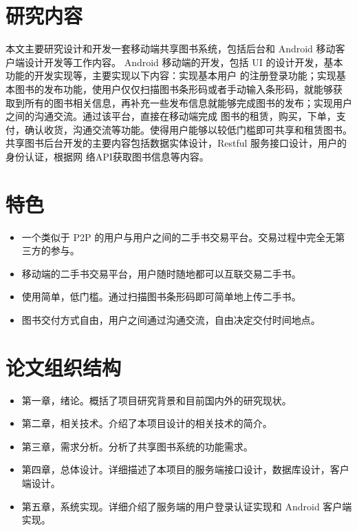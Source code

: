\section{研究内容}

本文主要研究设计和开发一套移动端共享图书系统，包括后台和 Android 移动客户端设计开发等工作内容。
 Android 移动端的开发，包括 UI 的设计开发，基本功能的开发实现等，主要实现以下内容：实现基本用户
的注册登录功能；实现基本图书的发布功能，使用户仅仅扫描图书条形码或者手动输入条形码，就能够获
取到所有的图书相关信息，再补充一些发布信息就能够完成图书的发布；实现用户之间的沟通交流。通过该平台，直接在移动端完成
图书的租赁，购买，下单，支付，确认收货，沟通交流等功能。使得用户能够以较低门槛即可共享和租赁图书。
共享图书后台开发的主要内容包括数据实体设计，Restful 服务接口设计，用户的身份认证，根据网
络API获取图书信息等内容。

\section{特色}

\begin{itemize}
    \item 一个类似于 P2P 的用户与用户之间的二手书交易平台。交易过程中完全无第三方的参与。
    \item 移动端的二手书交易平台，用户随时随地都可以互联交易二手书。
    \item 使用简单，低门槛。通过扫描图书条形码即可简单地上传二手书。
    \item 图书交付方式自由，用户之间通过沟通交流，自由决定交付时间地点。
\end{itemize}


\section{论文组织结构}

\begin{itemize}
    \item 第一章，绪论。概括了项目研究背景和目前国内外的研究现状。
    \item 第二章，相关技术。介绍了本项目设计的相关技术的简介。
    \item 第三章，需求分析。分析了共享图书系统的功能需求。
    \item 第四章，总体设计。详细描述了本项目的服务端接口设计，数据库设计，客户端设计。
    \item 第五章，系统实现。详细介绍了服务端的用户登录认证实现和 Android 客户端实现。
\end{itemize}
